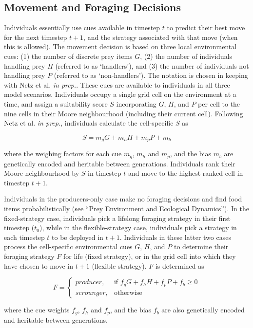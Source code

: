 \documentclass[11pt]{article}
\begin{document}
\subsection{Movement and Foraging Decisions}

Individuals essentially use cues available in timestep $t$ to predict their best move for the next timestep $t+1$, and the strategy associated with that move (when this is allowed).
The movement decision is based on three local environmental cues: (1) the number of discrete prey items $G$, (2) the number of individuals handling  prey $H$ (referred to as `handlers'), and (3) the number of individuals not handling prey $P$ (referred to as `non-handlers').
The notation is chosen in keeping with Netz et al. \textit{in prep.}.
These cues are available to individuals in all three model scenarios.
Individuals occupy a single grid cell on the environment at a time, and assign a suitability score $S$ incorporating $G$, $H$, and $P$ per cell to the nine cells in their Moore neighbourhood (including their current cell).
Following Netz et al. \textit{in prep.}, individuals calculate the cell-specific $S$ as
\begin{linenomath*}
    \begin{equation}
        S = m_gG + m_hH + m_pP + m_b
    \end{equation}
\end{linenomath*}
where the weighing factors for each cue $m_g$, $m_h$ and $m_p$, and the bias $m_b$ are genetically encoded and heritable between generations.
Individuals rank their Moore neighbourhood by $S$ in timestep $t$ and move to the highest ranked cell in timestep $t+1$.

Individuals in the producers-only case make no foraging decisions and find food items probabilistically (see ``Prey Environment and Ecological Dynamics'').
In the fixed-strategy case, individuals pick a lifelong foraging strategy in their first timestep ($t_0$), while in the flexible-strategy case, individuals pick a strategy in each timestep $t$ to be deployed in $t+1$.
Individuals in these latter two cases process the cell-specific environmental cues $G$, $H$, and $P$ to determine their foraging strategy $F$ for life (fixed strategy), or in the grid cell into which they have chosen to move in $t+1$ (flexible strategy).
$F$ is determined as
\begin{linenomath*}
    \begin{equation}
        F = 
    \begin{cases}
        {producer},& \text{if } f_gG + f_hH + f_pP + f_b \geq 0\\
        {scrounger},              & \text{otherwise}
    \end{cases}
    \end{equation}
\end{linenomath*}
where the cue weights $f_g$, $f_h$ and $f_p$, and the bias $f_b$ are also genetically encoded and heritable between generations.
\end{document}
